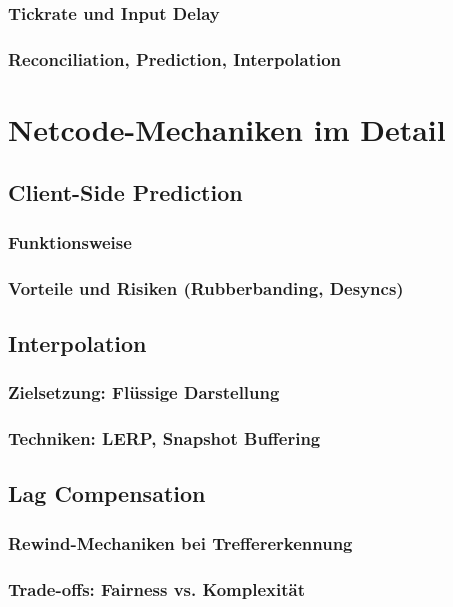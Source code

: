 \documentclass[12pt,a4paper]{article}
\begin{document}
\subsubsection{Tickrate und Input Delay}
\subsubsection{Reconciliation, Prediction, Interpolation}

\clearpage

\section{Netcode-Mechaniken im Detail}
\subsection{Client-Side Prediction}
\subsubsection{Funktionsweise}
\subsubsection{Vorteile und Risiken (Rubberbanding, Desyncs)}
\subsection{Interpolation}
\subsubsection{Zielsetzung: Flüssige Darstellung}
\subsubsection{Techniken: LERP, Snapshot Buffering}
\subsection{Lag Compensation}
\subsubsection{Rewind-Mechaniken bei Treffererkennung}
\subsubsection{Trade-offs: Fairness vs. Komplexität}

\clearpage
\end{document}
